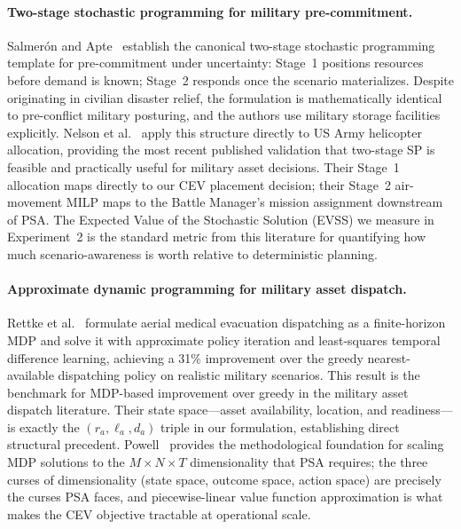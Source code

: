 \documentclass[11pt]{article}
\begin{document}
\paragraph{Two-stage stochastic programming for military pre-commitment.}
Salmer\'{o}n and Apte~\cite{salmeron2010} establish the canonical
two-stage stochastic programming template for pre-commitment under
uncertainty: Stage~1 positions resources before demand is known;
Stage~2 responds once the scenario materializes. Despite originating in
civilian disaster relief, the formulation is mathematically identical to
pre-conflict military posturing, and the authors use military storage
facilities explicitly. Nelson et al.~\cite{nelson2025} apply this
structure directly to US Army helicopter allocation, providing the most
recent published validation that two-stage SP is feasible and practically
useful for military asset decisions. Their Stage~1 allocation maps
directly to our CEV placement decision; their Stage~2 air-movement MILP
maps to the Battle Manager's mission assignment downstream of PSA. The
Expected Value of the Stochastic Solution (EVSS) we measure in
Experiment~2 is the standard metric from this literature for quantifying
how much scenario-awareness is worth relative to deterministic planning.

\paragraph{Approximate dynamic programming for military asset dispatch.}
Rettke et al.~\cite{rettke2016} formulate aerial medical evacuation
dispatching as a finite-horizon MDP and solve it with approximate policy
iteration and least-squares temporal difference learning, achieving a
31\% improvement over the greedy nearest-available dispatching policy on
realistic military scenarios. This result is the benchmark for MDP-based
improvement over greedy in the military asset dispatch literature. Their
state space---asset availability, location, and readiness---is exactly
the $(r_a, \ell_a, d_a)$ triple in our formulation, establishing direct
structural precedent. Powell~\cite{powell2011} provides the methodological
foundation for scaling MDP solutions to the $M \times N \times T$
dimensionality that PSA requires; the three curses of dimensionality
(state space, outcome space, action space) are precisely the curses PSA
faces, and piecewise-linear value function approximation is what makes
the CEV objective tractable at operational scale.
\end{document}
